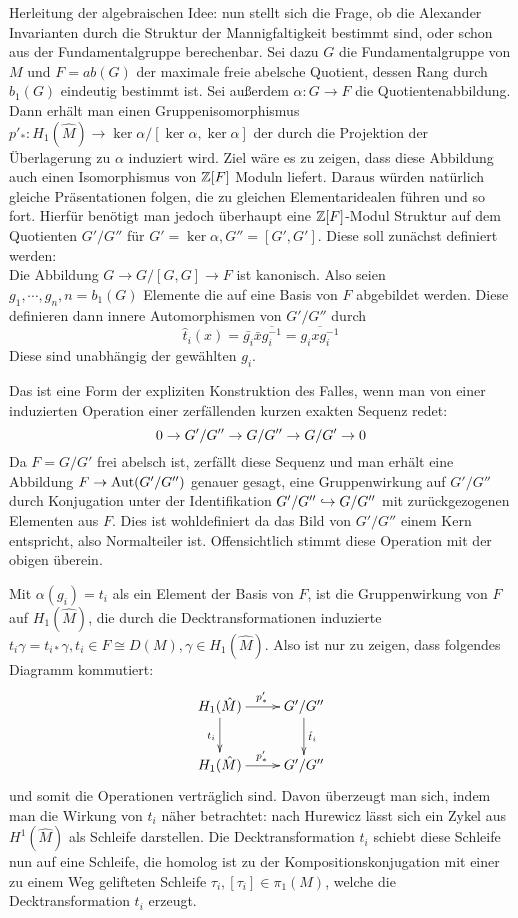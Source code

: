 Herleitung der algebraischen Idee: nun stellt sich die Frage, ob die Alexander Invarianten durch die Struktur der Mannigfaltigkeit bestimmt sind, oder schon aus der Fundamentalgruppe berechenbar. Sei dazu $G$ die Fundamentalgruppe von $M$ und $F=ab(G)$ der maximale freie abelsche Quotient, dessen Rang durch $b_1(G)$ eindeutig bestimmt ist. Sei außerdem $\alpha:G\to F$ die Quotientenabbildung. Dann erhält man einen Gruppenisomorphismus $p'_*: H_1(\hat M) \to \ker\alpha/[\ker\alpha,\ker\alpha]$ der durch die Projektion der Überlagerung zu $\alpha$ induziert wird. Ziel wäre es zu zeigen, dass diese Abbildung auch einen Isomorphismus von $\mathbb{Z}[F]$ Moduln liefert. Daraus würden natürlich gleiche Präsentationen folgen, die zu gleichen Elementaridealen führen und so fort. Hierfür benötigt man jedoch überhaupt eine $\mathbb{Z}[F]$-Modul Struktur auf dem Quotienten $G'/G''$ für $G'=\ker\alpha, G''=[G',G']$. Diese soll zunächst definiert werden:\\
Die Abbildung $G \to G/[G,G] \to F$ ist kanonisch. Also seien $g_1,\cdots,g_n,n=b_1(G)$ Elemente die auf eine Basis von $F$ abgebildet werden. Diese definieren dann innere Automorphismen von $G'/G''$ durch 
\[
	\hat t_i(x) = \bar{ g_i} \bar{ x}\overline{ g_i^{-1}} = \overline{{} g_i x g_i^{-1}}
\]
Diese sind unabhängig der gewählten $g_i$. 
\begin{bem}
 	Das ist eine Form der expliziten Konstruktion des Falles, wenn man von einer induzierten Operation einer zerfällenden kurzen exakten Sequenz redet:
 	\[
 		0\to G'/G''\to G/G''\to G/G'\to0
 	\]
 	Da $F= G/G'$ frei abelsch ist, zerfällt diese Sequenz und man erhält eine Abbildung $F \to \operatorname{Aut}(G'/G'')$ genauer gesagt, eine Gruppenwirkung auf $G'/G''$ durch Konjugation unter der Identifikation $G'/G''\hookrightarrow G/G''$ mit zurückgezogenen Elementen aus $F$. Dies ist wohldefiniert da das Bild von $G'/G''$ einem Kern entspricht, also Normalteiler ist. Offensichtlich stimmt diese Operation mit der obigen überein.
 \end{bem} 
 Mit $\alpha(g_i)=t_i$ als ein Element der Basis von $F$, ist die Gruppenwirkung von $F$ auf $H_1(\hat M)$, die durch die Decktransformationen induzierte $t_i\gamma = t_{i*}\gamma,t_i \in F \cong D(M), \gamma \in H_1(\hat M)$. Also ist nur zu zeigen, dass folgendes Diagramm kommutiert:
\[
	\begin{xy}
		\xymatrix{H_1(\hat M) \ar[d]_{t_i} \ar[r]^{p'_*} & G'/G'' \ar[d]^{\hat t_i}\\
		H_1(\hat M)  \ar[r]^{p'_*} & G'/G'' }
	\end{xy}
\]
und somit die Operationen verträglich sind. Davon überzeugt man sich, indem man die Wirkung von $t_i$ näher betrachtet: nach Hurewicz lässt sich ein Zykel aus $H^1(\hat M)$ als Schleife darstellen. Die Decktransformation $t_i$ schiebt diese Schleife nun auf eine Schleife, die homolog ist zu der Kompositionskonjugation mit einer zu einem Weg gelifteten Schleife $\tau_i, [\tau_i] \in \pi_1(M)$, welche die Decktransformation $t_i$ erzeugt. \\
